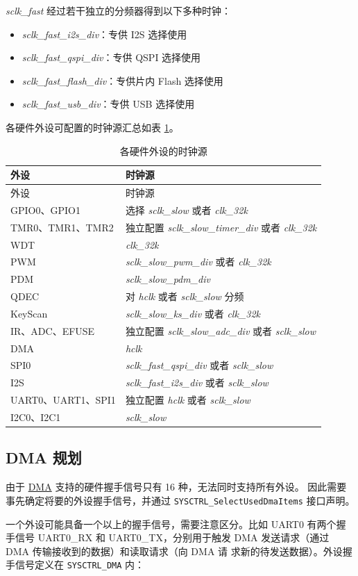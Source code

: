\documentclass[
  12pt,
]{book}
\providecommand{\tightlist}{%
  \setlength{\itemsep}{0pt}\setlength{\parskip}{0pt}}
\begin{document}
\begin{enumerate}
  \emph{sclk\_fast} 经过若干独立的分频器得到以下多种时钟：

  \begin{itemize}
  \tightlist
  \item
    \emph{sclk\_fast\_i2s\_div}：专供 I2S 选择使用
  \item
    \emph{sclk\_fast\_qspi\_div}：专供 QSPI 选择使用
  \item
    \emph{sclk\_fast\_flash\_div}：专供片内 Flash 选择使用
  \item
    \emph{sclk\_fast\_usb\_div}：专供 USB 选择使用
  \end{itemize}
\end{enumerate}

各硬件外设可配置的时钟源汇总如表 \ref{tab:ch-sysctrl-tab-clk}。

\begin{longtable}[]{@{}ll@{}}
\caption{\label{tab:ch-sysctrl-tab-clk} 各硬件外设的时钟源}\tabularnewline
\toprule
外设 & 时钟源\tabularnewline
\midrule
\endfirsthead
\toprule
外设 & 时钟源\tabularnewline
\midrule
\endhead
GPIO0、GPIO1 & 选择 \emph{sclk\_slow} 或者 \emph{clk\_32k}\tabularnewline
TMR0、TMR1、TMR2 & 独立配置 \emph{sclk\_slow\_timer\_div} 或者 \emph{clk\_32k}\tabularnewline
WDT & \emph{clk\_32k}\tabularnewline
PWM & \emph{sclk\_slow\_pwm\_div} 或者 \emph{clk\_32k}\tabularnewline
PDM & \emph{sclk\_slow\_pdm\_div}\tabularnewline
QDEC & 对 \emph{hclk} 或者 \emph{sclk\_slow} 分频\tabularnewline
KeyScan & \emph{sclk\_slow\_ks\_div} 或者 \emph{clk\_32k}\tabularnewline
IR、ADC、EFUSE & 独立配置 \emph{sclk\_slow\_adc\_div} 或者 \emph{sclk\_slow}\tabularnewline
DMA & \emph{hclk}\tabularnewline
SPI0 & \emph{sclk\_fast\_qspi\_div} 或者 \emph{sclk\_slow}\tabularnewline
I2S & \emph{sclk\_fast\_i2s\_div} 或者 \emph{sclk\_slow}\tabularnewline
UART0、UART1、SPI1 & 独立配置 \emph{hclk} 或者 \emph{sclk\_slow}\tabularnewline
I2C0、I2C1 & \emph{sclk\_slow}\tabularnewline
\bottomrule
\end{longtable}

\hypertarget{dma-ux89c4ux5212}{%
\subsection{DMA 规划}\label{dma-ux89c4ux5212}}

由于 \protect\hyperlink{ch-dma}{DMA} 支持的硬件握手信号只有 16 种，无法同时支持所有外设。
因此需要事先确定将要的外设握手信号，并通过 \texttt{SYSCTRL\_SelectUsedDmaItems} 接口声明。

一个外设可能具备一个以上的握手信号，需要注意区分。比如 UART0 有两个握手信号 UART0\_RX 和
UART0\_TX，分别用于触发 DMA 发送请求（通过 DMA 传输接收到的数据）和读取请求（向 DMA 请
求新的待发送数据）。外设握手信号定义在 \texttt{SYSCTRL\_DMA} 内：
\end{document}
